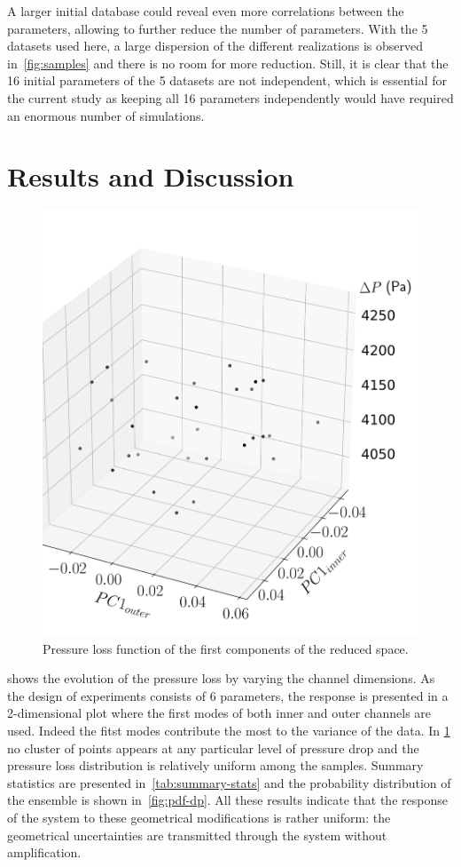 A larger initial database could reveal even more correlations between the parameters, allowing to further reduce the number of parameters. With the 5 datasets used here, a large dispersion of the different realizations is observed in~\cref{fig:samples} and there is no room for more reduction. Still, it is clear that the 16 initial  parameters of the 5 datasets are not independent, which is essential for the current study as keeping all 16 parameters independently would have required an enormous number of simulations.

\section{Results and Discussion}\label{sec:disc}

\begin{figure}[!ht]
\centering
\includegraphics[width=0.6\linewidth,keepaspectratio]{fig/applications/swirler/scatter_3D.pdf}
\caption{Pressure loss function of the first components of the reduced space.}
\label{fig:scatter-dp}
\end{figure}

 shows the evolution of the pressure loss by varying the channel dimensions. As the design of experiments consists of 6 parameters, the response is presented in a 2-dimensional plot where the first modes of both inner and outer channels are used. Indeed the fitst modes contribute the most to the variance of the data. In \cref{fig:scatter-dp} no cluster of points appears at any particular level of pressure drop and the pressure loss distribution is relatively uniform among the samples. Summary statistics are presented in~\cref{tab:summary-stats} and the probability distribution of the ensemble is shown in~\cref{fig:pdf-dp}.  All these results indicate that the response of the system to these geometrical modifications is rather uniform: the geometrical uncertainties are transmitted through the system without amplification.

